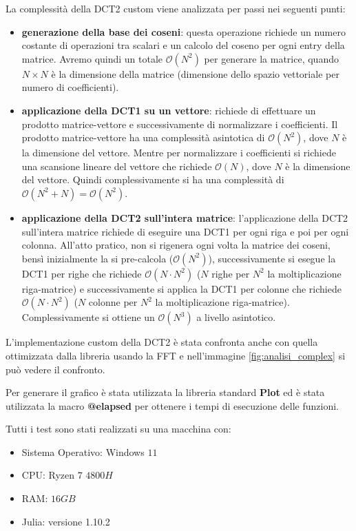 La complessità della DCT2 custom viene analizzata per passi nei seguenti punti:
\begin{itemize}
    \item \textbf{generazione della base dei coseni}: questa operazione richiede
          un numero costante di operazioni tra scalari e un calcolo del coseno per ogni
          entry della matrice. Avremo quindi un totale $\mathcal{O}(N^2)$ per generare
          la matrice, quando $N\times N$ è la dimensione della matrice (dimensione dello
          spazio vettoriale per numero di coefficienti).
    \item \textbf{applicazione della DCT1 su un vettore}: richiede di effettuare
          un prodotto matrice-vettore e successivamente di normalizzare i coefficienti.
          Il prodotto matrice-vettore ha una complessità asintotica di
          $\mathcal{O}(N^2)$, dove $N$ è la dimensione del vettore. Mentre per
          normalizzare i coefficienti si richiede una scansione
          lineare del vettore che richiede $\mathcal{O}(N)$, dove $N$ è la dimensione
          del vettore. Quindi complessivamente si ha una complessità di $\mathcal{O}(N^2 + N) = \mathcal{O}(N^2)$.
    \item \textbf{applicazione della DCT2 sull'intera matrice}: l'applicazione della DCT2
          sull'intera matrice richiede di eseguire una DCT1 per ogni riga e poi per ogni
          colonna. All'atto pratico, non si rigenera ogni volta la matrice dei coseni,
          bensì inizialmente la si pre-calcola ($\mathcal{O}(N^2)$), successivamente si
          esegue la DCT1 per righe che richiede $\mathcal{O}(N \cdot N^2)$ ($N$ righe
          per $N^2$ la moltiplicazione riga-matrice) e successivamente si applica la
          DCT1 per colonne che richiede $\mathcal{O}(N \cdot N^2)$ ($N$ colonne
          per $N^2$ la moltiplicazione riga-matrice). Complessivamente si ottiene
          un $\mathcal{O}(N^3)$ a livello asintotico.
\end{itemize}

L'implementazione custom della DCT2 è stata confronta anche con quella ottimizzata
dalla libreria usando la FFT e nell'immagine \ref{fig:analisi_complex} si
può vedere il confronto.

Per generare il grafico è stata utilizzata la libreria standard \textbf{Plot} ed
è stata utilizzata la macro \textbf{@elapsed} per ottenere i tempi di esecuzione
delle funzioni.

Tutti i test sono stati realizzati su una macchina con:
\begin{itemize}
    \item Sistema Operativo: Windows $11$
    \item CPU: Ryzen $7$ $4800H$
    \item RAM: $16GB$
    \item Julia: versione 1.10.2
\end{itemize}

